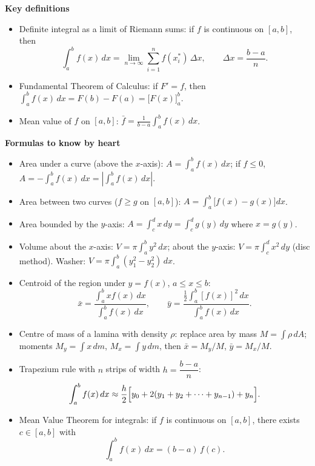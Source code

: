 \documentclass[11pt]{article}
\newcommand{\cle}[1]{{\popxbold\color{popdark}#1}}
\begin{document}
\begin{bilan}
\textbf{Key definitions}
\begin{itemize}
\item \cle{Definite integral} as a limit of Riemann sums: if $f$ is continuous on $[a,b]$, then
\[ \int_a^b f(x)\,dx=\lim_{n\to\infty}\sum_{i=1}^{n} f(x_i^{*})\,\Delta x,\qquad \Delta x=\frac{b-a}{n}. \]
\item \cle{Fundamental Theorem of Calculus}: if $F'=f$, then $\displaystyle\int_a^b f(x)\,dx=F(b)-F(a)=\bigl[F(x)\bigr]_a^b$.
\item \cle{Mean value} of $f$ on $[a,b]$: $\displaystyle \bar{f}=\frac{1}{b-a}\int_a^b f(x)\,dx$.
\end{itemize}

\textbf{Formulas to know by heart}
\begin{itemize}
\item Area under a curve (above the $x$-axis): $\displaystyle A=\int_a^b f(x)\,dx$; if $f\le 0$, $A=-\displaystyle\int_a^b f(x)\,dx=\left|\int_a^b f(x)\,dx\right|$.
\item Area between two curves ($f\ge g$ on $[a,b]$): $\displaystyle A=\int_a^b\bigl[f(x)-g(x)\bigr]dx$.
\item Area bounded by the $y$-axis: $\displaystyle A=\int_c^d x\,dy=\int_c^d g(y)\,dy$ where $x=g(y)$.
\item Volume about the $x$-axis: $\displaystyle V=\pi\int_a^b y^2\,dx$; about the $y$-axis: $\displaystyle V=\pi\int_c^d x^2\,dy$ (disc method). Washer: $V=\pi\int_a^b(y_1^2-y_2^2)\,dx$.
\item Centroid of the region under $y=f(x)$, $a\le x\le b$:
\[ \bar{x}=\frac{\displaystyle\int_a^b x f(x)\,dx}{\displaystyle\int_a^b f(x)\,dx},\qquad
\bar{y}=\frac{\displaystyle\tfrac12\int_a^b [f(x)]^2\,dx}{\displaystyle\int_a^b f(x)\,dx}. \]
\item Centre of mass of a lamina with density $\rho$: replace area by mass $M=\int \rho\,dA$; moments $M_y=\int x\,dm$, $M_x=\int y\,dm$, then $\bar{x}=M_y/M$, $\bar{y}=M_x/M$.
\item \cle{Trapezium rule} with $n$ strips of width $h=\dfrac{b-a}{n}$:
\[ \int_a^b f(x)\,dx\approx \frac{h}{2}\Bigl[y_0+2(y_1+y_2+\cdots+y_{n-1})+y_n\Bigr]. \]
\item \cle{Mean Value Theorem for integrals}: if $f$ is continuous on $[a,b]$, there exists $c\in[a,b]$ with
\[ \int_a^b f(x)\,dx=(b-a)\,f(c). \]
\end{itemize}


\end{bilan}
\end{document}

